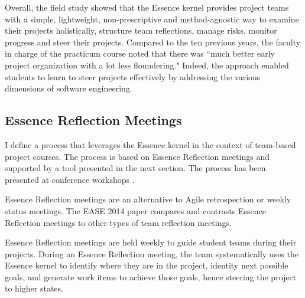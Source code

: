 \documentclass[preprint,12pt,3p]{elsarticle}
\begin{document}
Overall, the field study showed that the Essence kernel provides project teams with a simple, lightweight, non-prescriptive and method-agnostic way to examine their projects holistically, structure team reflections, manage risks, monitor progress and steer their projects. Compared to the ten previous years, the faculty in charge of the practicum course noted that there was ``much better early project organization with a lot less floundering." Indeed, the approach enabled students to learn to steer projects effectively by addressing the various dimensions of software engineering.


\subsection{Essence Reflection Meetings}
\label{EssenceReflectionMeetings}
I define a process that leverages the Essence kernel in the context of team-based project courses. The process is based on Essence Reflection meetings and supported by a tool presented in the next section. The process has been presented at conference workshops \cite{SCSE2015Tutorial, CSEET2015Workshop}. 

Essence Reflection meetings are an alternative to Agile retrospection or weekly status meetings. The EASE 2014 paper \cite{EASE2014} compares and contrasts Essence Reflection meetings to other types of team reflection meetings.

Essence Reflection meetings are held weekly to guide student teams during their projects. During an Essence Reflection meeting, the team systematically uses the Essence kernel to identify where they are in the project, identity next possible goals, and generate work items to achieve those goals, hence steering the project to higher states. 
\end{document}
